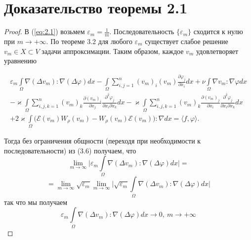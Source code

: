 \section{Доказательство теоремы 2.1}

\begin{proof}
    В (\ref{eq:2.1}) возьмем $\varepsilon_m = \frac{1}{m}$. Последовательность $\{\varepsilon_m\}$ сходится к нулю при $m \rightarrow +\infty$.
    По теореме 3.2 для любого $\varepsilon_m$ существует слабое решение $v_m \in X \subset V$ задачи аппроксимации.
    Таким образом, каждое $v_m$ удовлетворяет уравнению

    \begin{equation}\label{eq:4.1}
        \begin{gathered}
            \varepsilon_m \int\limits_{\Omega} \nabla (\Delta v_m): \nabla (\Delta \varphi) dx -
            \int\limits_{\Omega}\sum_{i,j=1}^n (v_m)_i (v_m) \frac{\partial \varphi_j}{\partial x_i} dx + \nu
            \int\limits_{\Omega} \nabla v_m: \nabla \varphi dx\\
            -\varkappa \int\limits_{\Omega}\sum_{i,j,k=1}^n (v_m)_k
            \frac{\partial (v_m)_i}{\partial x_j} \frac{\partial^2 \varphi_j}{\partial x_i \partial x_k} dx - \varkappa \int\limits_{\Omega}\sum_{i,j,k=1}^n
            (v_m)_k \frac{\partial (v_m)_j}{\partial x_i} \frac{\partial^2 \varphi_j}{\partial x_i \partial x_k} dx\\
            +2\varkappa \int\limits_{\Omega} \bigg(\mathcal{E}(v_m)W_\rho (v_m) - W_\rho(v_m)\mathcal{E}(v_m)\bigg): \nabla dx =
            \langle f, \varphi \rangle.
        \end{gathered}
    \end{equation}

    Тогда без ограничения общности (переходя при необходимости к последовательности) из (3.6) получаем, что
    $$\lim_{m \rightarrow \infty}\bigg| \varepsilon_m \int\limits_{\Omega} \nabla (\Delta v_m): \nabla (\Delta \varphi) dx \bigg| =$$
    $$=\lim_{m \rightarrow \infty} \sqrt{\varepsilon_m} \lim_{m \rightarrow \infty}\bigg|\sqrt{\varepsilon_m}
    \int\limits_{\Omega} \nabla (\Delta v_m): \nabla (\Delta \varphi) dx \bigg|$$
    так что мы получаем
    $$\varepsilon_m \int\limits_{\Omega} \nabla (\Delta v_m): \nabla (\Delta \varphi) dx \rightarrow 0, \ m \rightarrow +\infty$$


\end{proof}
